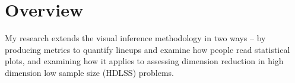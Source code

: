 


%

\section{Overview}

My research extends the visual inference methodology in two ways -- by producing metrics to quantify lineups and examine how people read statistical plots, and examining how it applies to assessing dimension reduction in high dimension low sample size (HDLSS) problems. 

